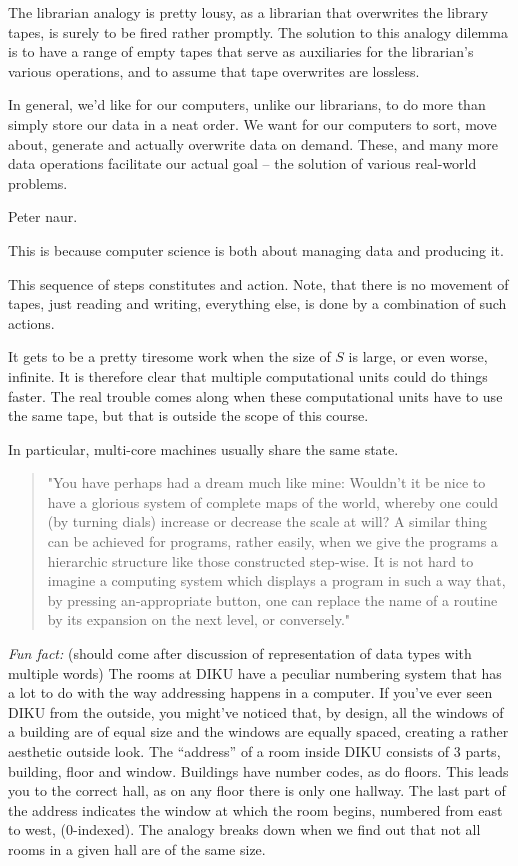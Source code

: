The librarian analogy is pretty lousy, as a librarian that overwrites the
library tapes, is surely to be fired rather promptly. The solution to this
analogy dilemma is to have a range of empty tapes that serve as auxiliaries for
the librarian's various operations, and to assume that tape overwrites are
lossless. 


In general, we'd like for our computers, unlike our librarians, to do more than
simply store our data in a neat order. We want for our computers to sort, move
about, generate and actually overwrite data on demand. These, and many more
data operations facilitate our actual goal -- the solution of various
real-world problems.

Peter naur.

This is because computer science is both about
managing data and producing it. 

This sequence of steps constitutes and action. Note, that there is no movement
of tapes, just reading and writing, everything else, is done by a combination
of such actions.


It gets to be a pretty tiresome work when the size of
$S$ is large, or even worse, infinite. It is therefore clear that multiple computational
units could do things faster. The real trouble comes along when these
computational units have to use the same tape, but that is outside the scope of
this course.

In particular, multi-core machines usually share the same state.




\begin{quote}"You have perhaps had a dream much like mine: Wouldn't it be nice
to have a glorious system of complete maps of the world, whereby one could (by
turning dials) increase or decrease the scale at will? A similar thing can be
achieved for programs, rather easily, when we give the programs a hierarchic
structure like those constructed step-wise. It is not hard to imagine a
computing system which displays a program in such a way that, by pressing
an-appropriate button, one can replace the name of a routine by its expansion
on the next level, or conversely."\cite{knuth-review-of-sp}\end{quote}

\emph{Fun fact:} (should come after discussion of representation of data types
with multiple words) The rooms at DIKU have a peculiar numbering system that
has a lot to do with the way addressing happens in a computer. If you've ever
seen DIKU from the outside, you might've noticed that, by design, all the
windows of a building are of equal size and the windows are equally spaced,
creating a rather aesthetic outside look. The ``address'' of a room inside DIKU
consists of 3 parts, building, floor and window. Buildings have number codes,
as do floors. This leads you to the correct hall, as on any floor there is only
one hallway. The last part of the address indicates the window at which the
room begins, numbered from east to west, (0-indexed). The analogy breaks down
when we find out that not all rooms in a given hall are of the same size.



